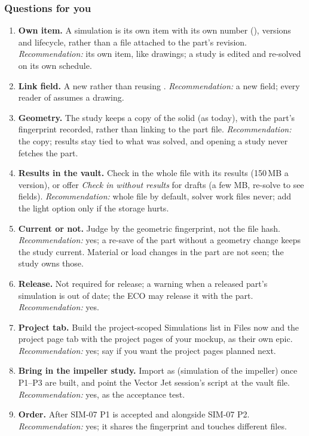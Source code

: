 \subsubsection*{Questions for you}
\begin{enumerate}[label=P\arabic*.]
  \item \textbf{Own item.} A simulation is its own item with its own number (), versions and lifecycle,
        rather than a file attached to the part's revision. \emph{Recommendation:} its own item, like drawings; a
        study is edited and re-solved on its own schedule.
  \item \textbf{Link field.} A new  rather than reusing . \emph{Recommendation:}
        a new field; every reader of  assumes a drawing.
  \item \textbf{Geometry.} The study keeps a copy of the solid (as today), with the part's fingerprint recorded, rather
        than linking to the part file. \emph{Recommendation:} the copy; results stay tied to what was solved, and
        opening a study never fetches the part.
  \item \textbf{Results in the vault.} Check in the whole file with its results (150\,MB a version), or offer
        \emph{Check in without results} for drafts (a few MB, re-solve to see fields). \emph{Recommendation:} whole
        file by default, solver work files never; add the light option only if the storage hurts.
  \item \textbf{Current or not.} Judge by the geometric fingerprint, not the file hash. \emph{Recommendation:} yes;
        a re-save of the part without a geometry change keeps the study current. Material or load changes in the
        part are not seen; the study owns those.
  \item \textbf{Release.} Not required for release; a warning when a released part's simulation is out of date; the
        ECO may release it with the part. \emph{Recommendation:} yes.
  \item \textbf{Project tab.} Build the project-scoped Simulations list in Files now and the project page tab with
        the project pages of your mockup, as their own epic. \emph{Recommendation:} yes; say if you want the project
        pages planned next.
  \item \textbf{Bring in the impeller study.} Import  as 
        (simulation of the impeller) once P1--P3 are built, and point the Vector Jet session's script at the vault
        file. \emph{Recommendation:} yes, as the acceptance test.
  \item \textbf{Order.} After SIM-07 P1 is accepted and alongside SIM-07 P2. \emph{Recommendation:} yes; it shares
        the fingerprint and touches different files.
\end{enumerate}

